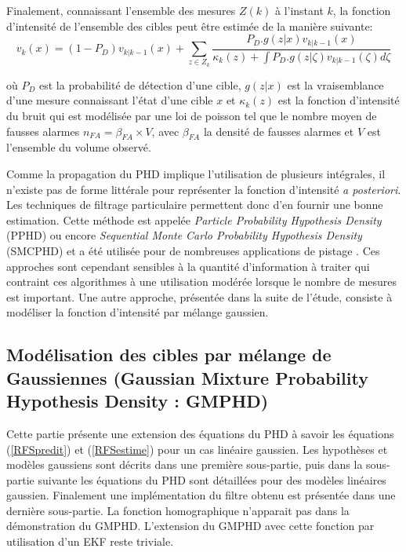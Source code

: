 \documentclass[10pt,french,a4paper]{report}
\begin{document}
Finalement, connaissant l'ensemble des mesures $Z(k)$ à l'instant $k$, la fonction d'intensité de l'ensemble des cibles peut être estimée de la manière suivante:
\begin{equation}
 v_{k}(x)=(1-P_D)v_{k|k-1}(x) + \sum\limits_{z\in Z_k}\dfrac{P_D.g(z|x)v_{k|k-1}(x)}{\kappa_k(z)+\int P_D.g(z|\zeta)v_{k|k-1}(\zeta)d\zeta}
 \label{RFSestime}
\end{equation}

 \noindent où $P_D$ est la probabilité de détection d'une cible, $g(z|x)$ est la vraisemblance d'une mesure connaissant l'état d'une cible $x$ et $\kappa_k(z)$ est la fonction d'intensité du bruit qui est modélisée par une loi de poisson tel que le nombre moyen de fausses alarmes $n_{FA}=\beta_{FA}\times V$, avec $\beta_{FA}$ la densité de fausses alarmes et $V$ est l'ensemble du volume observé.
 
 Comme la propagation du \ac{PHD} implique l'utilisation de plusieurs intégrales, il n'existe pas de forme littérale pour représenter la fonction d'intensité \textit{a posteriori}. Les techniques de filtrage particulaire permettent donc d'en fournir une bonne estimation. Cette méthode est appelée \textit{Particle Probability Hypothesis Density} (PPHD) ou encore \textit{Sequential Monte Carlo Probability Hypothesis Density} (SMCPHD) et a été utilisée pour de nombreuses applications de pistage \cite{Lin06, Vo05b, Clark08, Clark06, Clark07, Schuhmacher08}. Ces approches sont cependant sensibles à la quantité d'information à traiter qui contraint ces algorithmes à une utilisation modérée lorsque le nombre de mesures est important. Une autre approche, présentée dans la suite de l'étude, consiste à modéliser la fonction d'intensité par mélange gaussien. 

  
\subsection{Modélisation des cibles par mélange de Gaussiennes (Gaussian Mixture Probability Hypothesis Density : GMPHD)}
Cette partie présente une extension des équations du \ac{PHD} à savoir les équations (\ref{RFSpredit}) et (\ref{RFSestime}) pour un cas linéaire gaussien. Les hypothèses et modèles gaussiens sont décrits dans une première sous-partie, puis dans la sous-partie suivante les équations du \ac{PHD} sont détaillées pour des modèles linéaires gaussien. Finalement une implémentation du filtre obtenu est présentée dans une dernière sous-partie. La fonction homographique n'apparait pas dans la démonstration du \ac{GMPHD}. L'extension du \ac{GMPHD} avec cette fonction par utilisation d'un \ac{EKF} reste triviale.
\end{document}
